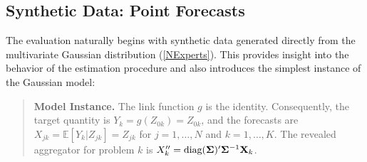 \documentclass[11pt]{article}
\newcommand{\E}{\mathbb{E}}
\theoremstyle{definition}
\theoremstyle{definition}
\def\bSigma{{\bf \Sigma}}
\def\X{{\bf X}}
\def\E{{\mathbb E}}
\def\diag{\text{diag}}
\def\diag{\text{diag}}
\begin{document}

\subsection{Synthetic Data: Point Forecasts}
\label{simulation}
The evaluation naturally begins with synthetic data generated directly from the multivariate Gaussian distribution (\ref{NExperts}). This  provides insight into the behavior of the estimation procedure and also introduces the simplest instance of the Gaussian model:

\begin{quote}
{\bf Model Instance.}  The link function $g$ is the identity. Consequently, the target quantity is $Y_k = g(Z_{0k}) = Z_{0k}$, and the forecasts are $X_{jk} = \E[Y_k | Z_{jk}] = Z_{jk}$ for $j = 1, \dots, N$ and $k = 1, \dots, K$. The revealed aggregator for problem $k$ is $X_k'' = \diag(\bSigma)' \bSigma^{-1} \X_k$. 
\end{quote}
\end{document}

